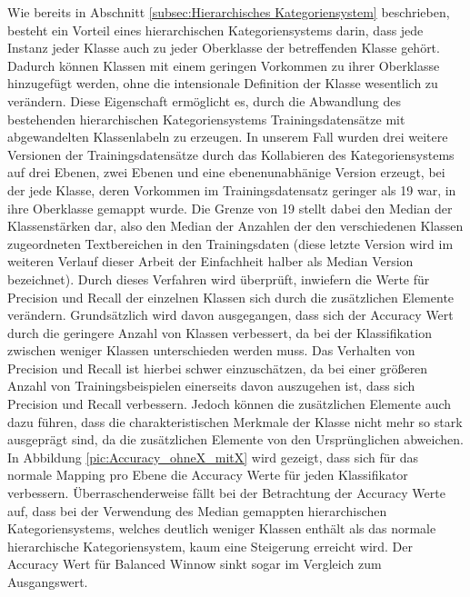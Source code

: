Wie bereits in Abschnitt \ref{subsec:Hierarchisches Kategoriensystem} beschrieben, besteht ein Vorteil eines hierarchischen Kategoriensystems darin, dass jede Instanz jeder Klasse auch zu jeder Oberklasse der betreffenden Klasse gehört. Dadurch können Klassen mit einem geringen Vorkommen zu ihrer Oberklasse hinzugefügt werden, ohne die intensionale Definition der Klasse wesentlich zu verändern. Diese Eigenschaft ermöglicht es, durch die Abwandlung des bestehenden hierarchischen Kategoriensystems Trainingsdatensätze mit abgewandelten Klassenlabeln zu erzeugen. In unserem Fall wurden drei weitere Versionen der Trainingsdatensätze durch das Kollabieren des Kategoriensystems auf drei Ebenen, zwei Ebenen und eine ebenenunabhänige Version erzeugt, bei der jede Klasse, deren Vorkommen im Trainingsdatensatz geringer als 19 war, in ihre Oberklasse gemappt wurde. Die Grenze von 19 stellt dabei den Median der Klassenstärken dar, also den Median der Anzahlen der den verschiedenen Klassen zugeordneten Textbereichen in den Trainingsdaten (diese letzte Version wird im weiteren Verlauf dieser Arbeit der Einfachheit halber als Median Version bezeichnet). Durch dieses Verfahren wird überprüft, inwiefern die Werte für Precision und Recall der einzelnen Klassen sich durch die zusätzlichen Elemente verändern. Grundsätzlich wird davon ausgegangen, dass sich der Accuracy Wert durch die geringere Anzahl von Klassen verbessert, da bei der Klassifikation zwischen weniger Klassen unterschieden werden muss. Das Verhalten von Precision und Recall ist hierbei schwer einzuschätzen, da bei einer größeren Anzahl von Trainingsbeispielen einerseits davon auszugehen ist, dass sich Precision und Recall verbessern. Jedoch können die zusätzlichen Elemente auch dazu führen, dass die charakteristischen Merkmale der Klasse nicht mehr so stark ausgeprägt sind, da die zusätzlichen Elemente von den Ursprünglichen abweichen. In Abbildung \ref{pic:Accuracy_ohneX_mitX} wird gezeigt, dass sich für das normale Mapping pro Ebene die Accuracy Werte für jeden Klassifikator verbessern. Überraschenderweise fällt bei der Betrachtung der Accuracy Werte auf, dass bei der Verwendung des Median gemappten hierarchischen Kategoriensystems, welches deutlich weniger Klassen enthält als das normale hierarchische Kategoriensystem, kaum eine Steigerung erreicht wird. Der Accuracy Wert für Balanced Winnow sinkt sogar im Vergleich zum Ausgangswert. 

